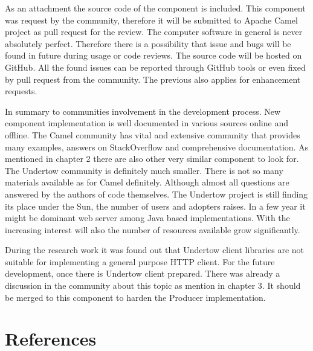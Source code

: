 \documentclass[12pt,final,oneside]{fithesis2}
\begin{document}
As an attachment the source code of the component is included. This component was request by the community, therefore it will be submitted to Apache Camel project as pull request for the review. The computer software in general is never absolutely perfect. Therefore there is a possibility that issue and bugs will be found in future during usage or code reviews. The source code will be hosted on GitHub. All the found issues can be reported through GitHub tools or even fixed by pull request from the community. The previous also applies for enhancement requests.

In summary to communities involvement in the development process. New component implementation is well documented in various sources online and offline. The Camel community has vital and extensive community that provides many examples, answers on StackOverflow and comprehensive documentation. As mentioned in chapter 2 there are also other very similar component to look for. The Undertow community is definitely much smaller. There is not so many materials available as for Camel definitely. Although almost all questions are answered by the authors of code themselves. The Undertow project is still finding its place under the Sun, the number of users and adopters raises. In a few year it might be dominant web server among Java based implementations. With the increasing interest will also the number of resources available grow significantly. 

During the research work it was found out that Undertow client libraries are not suitable for implementing a general purpose HTTP client.
For the future development, once there is Undertow client prepared. There was already a discussion in the community about this topic as mention in chapter 3. It should be merged to this component to harden the Producer implementation.

  



\begingroup
\def\tmpchapter{0}
\renewcommand{\chaptername}{}
\renewcommand{\thechapter}{}
\chapter{References}
\renewcommand{\chapter}[2]{}%
\end{document}
